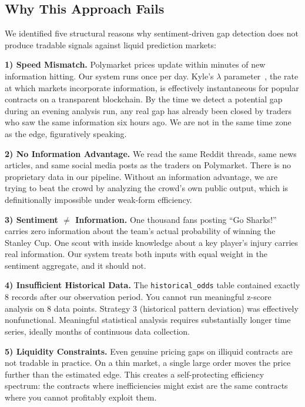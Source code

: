 \documentclass[conference]{IEEEtran}
\begin{document}
\subsection{Why This Approach Fails}

We identified five structural reasons why sentiment-driven gap detection does not produce tradable signals against liquid prediction markets:

\textbf{1) Speed Mismatch.} Polymarket prices update within minutes of new information hitting. Our system runs once per day. Kyle's $\lambda$ parameter~\cite{kyle1985}, the rate at which markets incorporate information, is effectively instantaneous for popular contracts on a transparent blockchain. By the time we detect a potential gap during an evening analysis run, any real gap has already been closed by traders who saw the same information six hours ago. We are not in the same time zone as the edge, figuratively speaking.

\textbf{2) No Information Advantage.} We read the same Reddit threads, same news articles, and same social media posts as the traders on Polymarket. There is no proprietary data in our pipeline. Without an information advantage, we are trying to beat the crowd by analyzing the crowd's own public output, which is definitionally impossible under weak-form efficiency.

\textbf{3) Sentiment $\neq$ Information.} One thousand fans posting ``Go Sharks!'' carries zero information about the team's actual probability of winning the Stanley Cup. One scout with inside knowledge about a key player's injury carries real information. Our system treats both inputs with equal weight in the sentiment aggregate, and it should not.

\textbf{4) Insufficient Historical Data.} The \texttt{historical\_odds} table contained exactly 8 records after our observation period. You cannot run meaningful z-score analysis on 8 data points. Strategy 3 (historical pattern deviation) was effectively nonfunctional. Meaningful statistical analysis requires substantially longer time series, ideally months of continuous data collection.

\textbf{5) Liquidity Constraints.} Even genuine pricing gaps on illiquid contracts are not tradable in practice. On a thin market, a single large order moves the price further than the estimated edge. This creates a self-protecting efficiency spectrum: the contracts where inefficiencies might exist are the same contracts where you cannot profitably exploit them.
\end{document}
